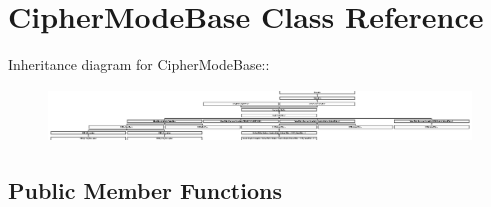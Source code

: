 \hypertarget{class_cipher_mode_base}{
\section{CipherModeBase Class Reference}
\label{class_cipher_mode_base}
}
Inheritance diagram for CipherModeBase::\begin{figure}[H]
\begin{center}
\leavevmode
\includegraphics[height=1.41176cm]{class_cipher_mode_base}
\end{center}
\end{figure}
\subsection*{Public Member Functions}
